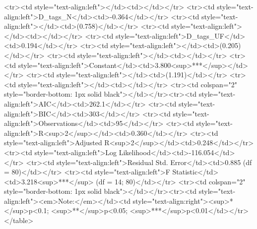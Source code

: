 <tr><td style="text-align:left"></td><td></td></tr>
<tr><td style="text-align:left">D_tags_N</td><td>-0.364</td></tr>
<tr><td style="text-align:left"></td><td>(0.758)</td></tr>
<tr><td style="text-align:left"></td><td></td></tr>
<tr><td style="text-align:left">D_tags_UF</td><td>0.194</td></tr>
<tr><td style="text-align:left"></td><td>(0.205)</td></tr>
<tr><td style="text-align:left"></td><td></td></tr>
<tr><td style="text-align:left">Constant</td><td>3.800<sup>***</sup></td></tr>
<tr><td style="text-align:left"></td><td>(1.191)</td></tr>
<tr><td style="text-align:left"></td><td></td></tr>
<tr><td colspan="2" style="border-bottom: 1px solid black"></td></tr><tr><td style="text-align:left">AIC</td><td>262.1</td></tr>
<tr><td style="text-align:left">BIC</td><td>303</td></tr>
<tr><td style="text-align:left">Observations</td><td>95</td></tr>
<tr><td style="text-align:left">R<sup>2</sup></td><td>0.360</td></tr>
<tr><td style="text-align:left">Adjusted R<sup>2</sup></td><td>0.248</td></tr>
<tr><td style="text-align:left">Log Likelihood</td><td>-116.054</td></tr>
<tr><td style="text-align:left">Residual Std. Error</td><td>0.885 (df = 80)</td></tr>
<tr><td style="text-align:left">F Statistic</td><td>3.218<sup>***</sup> (df = 14; 80)</td></tr>
<tr><td colspan="2" style="border-bottom: 1px solid black"></td></tr><tr><td style="text-align:left"><em>Note:</em></td><td style="text-align:right"><sup>*</sup>p<0.1; <sup>**</sup>p<0.05; <sup>***</sup>p<0.01</td></tr>
</table>
